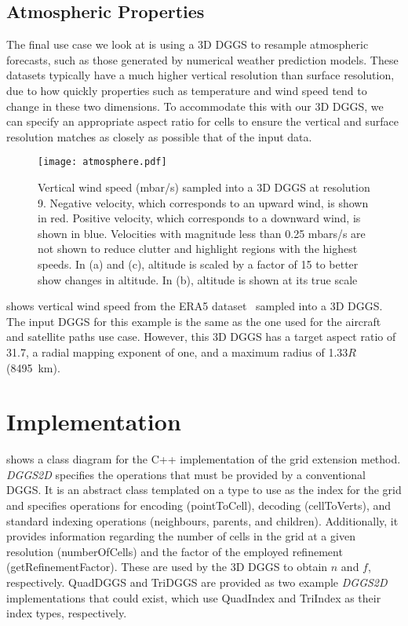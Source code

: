 \subsection{Atmospheric Properties}
The final use case we look at is using a 3D DGGS to resample atmospheric forecasts, such as those generated by numerical weather prediction models.
These datasets typically have a much higher vertical resolution than surface resolution, due to how quickly properties such as temperature and wind speed tend to change in these two dimensions.
To accommodate this with our 3D DGGS, we can specify an appropriate aspect ratio for cells to ensure the vertical and surface resolution matches as closely as possible that of the input data.


\begin{figure}[ht!]
	\centering
	\texttt{[image: atmosphere.pdf]}
	\caption[Atmospheric properties resampling use case showing vertical wind speed]{
		Vertical wind speed (mbar/s) sampled into a 3D DGGS at resolution 9.
		Negative velocity, which corresponds to an upward wind, is shown in red.
		Positive velocity, which corresponds to a downward wind, is shown in blue.
		Velocities with magnitude less than 0.25 mbars/s are not shown to reduce clutter and highlight regions with the highest speeds.
		In (a) and (c), altitude is scaled by a factor of 15 to better show changes in altitude.
		In (b), altitude is shown at its true scale
	}
	\label{fig:atmosphere}
\end{figure}


 shows vertical wind speed from the ERA5 dataset~\cite{era5} sampled into a 3D DGGS.
The input DGGS for this example is the same as the one used for the aircraft and satellite paths use case.
However, this 3D DGGS has a target aspect ratio of 31.7, a radial mapping exponent of one, and a maximum radius of 1.33$R$ (8495~km).


\section{Implementation} \label{chap:8:impl}
 shows a class diagram for the C++ implementation of the grid extension method. \textit{DGGS2D} specifies the operations that must be provided by a conventional DGGS. It is an abstract class templated on a type to use as the index for the grid and specifies operations for encoding (pointToCell), decoding (cellToVerts), and standard indexing operations (neighbours, parents, and children). Additionally, it provides information regarding the number of cells in the grid at a given resolution (numberOfCells) and the factor of the employed refinement (getRefinementFactor). These are used by the 3D DGGS to obtain $n$ and $f$, respectively. QuadDGGS and TriDGGS are provided as two example \textit{DGGS2D} implementations that could exist, which use QuadIndex and TriIndex as their index types, respectively.



